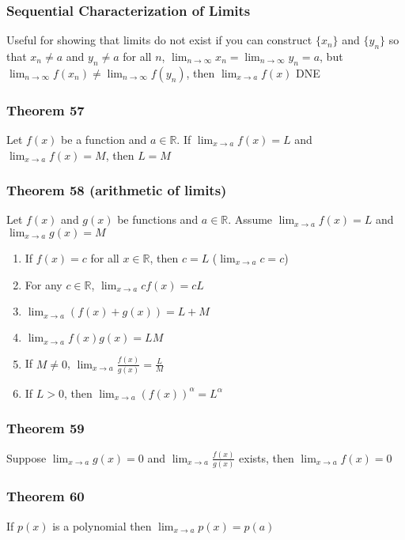 \documentclass[12pt, letterpaper]{article}
\begin{document}
\subsubsection*{Sequential Characterization of Limits}
Useful for showing that limits do not exist if you can construct $\{x_n\}$ and $\{y_n\}$ so that $x_n \neq a$ and $y_n \neq a$ for 
all $n$, $\displaystyle\lim_{n\to\infty} x_n = \displaystyle\lim_{n\to\infty} y_n = a$, but 
$\displaystyle\lim_{n\to\infty} f(x_n) \neq \displaystyle\lim_{n\to\infty} f(y_n)$, then 
$\displaystyle\lim_{x\to a} f(x)$ DNE
\subsubsection*{Theorem 57}
Let $f(x)$ be a function and $a\in\mathbb{R}$. If $\displaystyle\lim_{x\to a} f(x) = L$ and $\displaystyle\lim_{x\to a} f(x) = M$, then $L = M$
\subsubsection*{Theorem 58 (arithmetic of limits)}
Let $f(x)$ and $g(x)$ be functions and $a\in\mathbb{R}$. Assume $\displaystyle\lim_{x\to a} f(x) = L$ and $\displaystyle\lim_{x\to a} g(x) = M$
\begin{enumerate}
    \item If $f(x) = c$ for all $x\in\mathbb{R}$, then $c = L$ ($\displaystyle\lim_{x\to a} c = c$)
    \item For any $c\in\mathbb{R}$, $\displaystyle\lim_{x\to a} cf(x) = cL$
    \item $\displaystyle\lim_{x\to a} (f(x) + g(x)) = L+M$
    \item $\displaystyle\lim_{x\to a} f(x) g(x) = LM$
    \item If $M \neq 0$, $\displaystyle\lim_{x\to a} \frac{f(x)}{g(x)} = \frac{L}{M}$
    \item If $L > 0$, then $\displaystyle\lim_{x\to a} (f(x))^\alpha = L^\alpha$
\end{enumerate}
\subsubsection*{Theorem 59}
Suppose $\displaystyle\lim_{x\to a} g(x) = 0$ and $\displaystyle\lim_{x\to a} \frac{f(x)}{g(x)}$ exists, then $\displaystyle\lim_{x\to a} f(x) = 0$
\subsubsection*{Theorem 60}
If $p(x)$ is a polynomial then $\displaystyle\lim_{x\to a} p(x) = p(a)$
\end{document}
